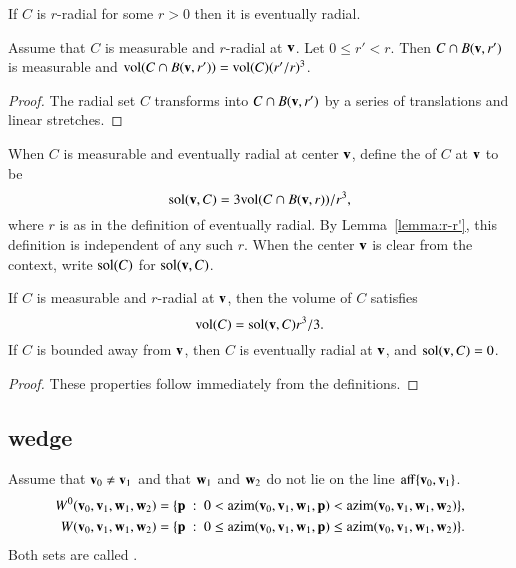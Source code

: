 \begin{lemma}
If $C$ is $r$-radial for some $r>0$ then it is eventually radial.
\end{lemma}

\begin{lemma}\label{lemma:r-r'}
Assume that $C$ is measurable and $r$-radial at ${\mathbf v}$.  Let $0\le
r'<r$.   Then $C\cap B({\mathbf v},r')$ is measurable and ${\operatorname{vol}}(C\cap
B({\mathbf v},r')) = {\operatorname{vol}}(C) (r'/r)^3$.
\end{lemma}

\begin{proof}  The radial set $C$ transforms into $C\cap B({\mathbf v},r')$ by
a series of translations and linear stretches.
\end{proof}


\begin{definition}\label{def:sol}
When $C$ is measurable and eventually radial at center ${\mathbf v}$, 
define the  of $C$ at ${\mathbf v}$ to be
\[ 
\operatorname{sol}({\mathbf v},C) = 3 {\operatorname{vol}}(C\cap B({\mathbf v},r))/r^3,
\] 
where $r$ is as in the definition of eventually radial. 
By Lemma~\ref{lemma:r-r'}, this
definition is independent of any such $r$.  When the center ${\mathbf v}$ is
clear from the context, write $\operatorname{sol}(C)$ for
$\operatorname{sol}({\mathbf v},C)$.
%
%
\end{definition}


\begin{lemma}
If $C$ is measurable and $r$-radial at ${\mathbf v}$, then the volume of $C$
satisfies
\[ 
{\operatorname{vol}}(C) = \operatorname{sol}({\mathbf v},C) r^3/3.
\] 
If $C$ is bounded away from ${\mathbf v}$, then $C$ is eventually radial at
${\mathbf v}$, and $\operatorname{sol}({\mathbf v},C) = 0$.
%
\end{lemma}

\begin{proof}
These properties follow immediately from the definitions.
\end{proof}



\subsection{wedge}
%


\begin{definition}[wedge]\label{def:wedge}
Assume that ${\mathbf v}_0\ne {\mathbf v}_1$ and that
${\mathbf w}_1$ and ${\mathbf w}_2$ do not lie on
the line ${\operatorname{aff}}\{{\mathbf v}_0,{\mathbf v}_1\}$.  
\begin{align*}
W^0(\v_0,\v_1,\w_1,\w_2) &= 
\{\p %
\mid 
0< \op{azim}(\v_0,\v_1,\w_1,\p) < \op{azim}(\v_0,\v_1,\w_1,\w_2)\},\\
W(\v_0,\v_1,\w_1,\w_2) &= 
\{\p \mid 
0\le \op{azim}(\v_0,\v_1,\w_1,\p) \le \op{azim}(\v_0,\v_1,\w_1,\w_2)\}.\\
\end{align*}
Both sets are called .
\end{definition}

